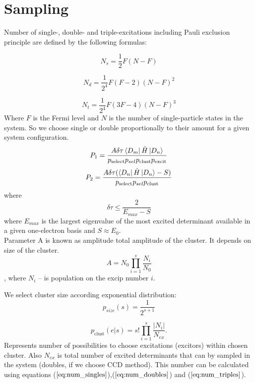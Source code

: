 \documentclass[twoside,english]{uiofysmaster}
\theoremstyle{definition}
\begin{document}
\section{Sampling}

Number of single-, double- and triple-excitations including Pauli exclusion principle are defined by the following formulas:

\begin{equation}\label{eq:num_singles}
N_s = \frac{1}{2}F(N-F)
\end{equation}

\begin{equation}\label{eq:num_doubles}
N_d = \frac{1}{2^4}F(F-2)(N-F)^2
\end{equation}

\begin{equation}\label{eq:num_triples}
N_t = \frac{1}{2^4}F(3F-4)(N-F)^3
\end{equation}
Where $F$ is the Fermi level and $N$ is the number of single-particle states in the system. So we choose single or double proportionally to their amount for a given system configuration.
\begin{equation}
P_1 = \frac{A \delta \tau \bra{D_m}\hat{H} \ket{D_n}}{p_{\text{select}}p_{sel}p_{\text{clust}}p_{\text{excit}}}
\end{equation}
\begin{equation}
P_2 = \frac{A \delta \tau (\bra{D_n}\hat{H} \ket{D_n}-S)}{p_{\text{select}}p_{sel}p_{\text{clust}}}
\end{equation}
where
\begin{equation}
\delta \tau \leq \frac{2}{E_{max} - S}
\end{equation}
where $E_{max}$ is the largest eigenvalue of the most excited determinant available in a given one-electron basis and $S \approx E_0$.\\
Parameter A is known as amplitude total amplitude of the cluster. It depends on size of the cluster.
\begin{equation}
A = N_0  \prod_{i=1}^s \frac{N_i}{N_0}
\end{equation},
where $N_i$ -- is population on the excip number $i$.

We select cluster size according exponential distribution:
\begin{equation}
p_{size}(s)=\frac{1}{2^{s+1}}
\end{equation}

\begin{equation}
p_{\text{clust}} (e|s)= s! \prod_{i=1}^s \frac{|N_i|}{N_{ex}}.
\end{equation}
Represents number of possibilities to choose excitations (excitors) within chosen cluster. Also $N_{ex}$ is total number of excited determinants that can by sampled in the system (doubles, if we choose CCD method). This number can be calculated using equations ($\ref{eq:num_singles}$),($\ref{eq:num_doubles}$) and ($\ref{eq:num_triples}$).
\end{document}
